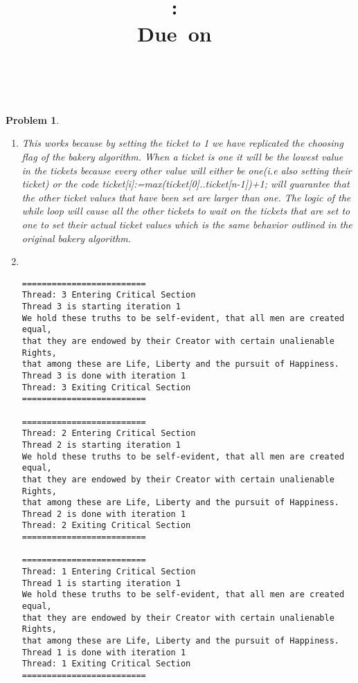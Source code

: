 \documentclass{article}
\title{
\vspace{2in}
\textmd{\textbf{\hmwkClass:\ \hmwkTitle}}\\
\normalsize\vspace{0.1in}\small{Due\ on\ \hmwkDueDate}\\
\vspace{0.1in}\large{\textit{\hmwkClassInstructor\ \hmwkClassTime}}
\vspace{3in}
}
\author{\textbf{\hmwkAuthorName}}
\date{} %
\theoremstyle{problemstyle}
\newtheorem{problem}{Problem}
\begin{document}
\maketitle



\newpage

\begin{problem} ~
\begin{enumerate}[label=(\alph*)]
	\item This works because by setting the ticket to 1 we have replicated the choosing flag of the bakery algorithm. When 
		a ticket is one it will be the lowest value in the tickets because every other value will either be one(i.e also setting their ticket) or the code ticket[i]:=max(ticket[0]..ticket[n-1])+1; will guarantee that the other ticket values that have been set are larger than one. The logic of the while loop will cause all the other tickets to wait on the tickets that are set to one to set their actual ticket values which is the same behavior outlined in the original bakery algorithm.
	\item ~
	\begin{lstlisting}
=========================
Thread: 3 Entering Critical Section
Thread 3 is starting iteration 1
We hold these truths to be self-evident, that all men are created equal,
that they are endowed by their Creator with certain unalienable Rights,
that among these are Life, Liberty and the pursuit of Happiness.
Thread 3 is done with iteration 1
Thread: 3 Exiting Critical Section
=========================

=========================
Thread: 2 Entering Critical Section
Thread 2 is starting iteration 1
We hold these truths to be self-evident, that all men are created equal,
that they are endowed by their Creator with certain unalienable Rights,
that among these are Life, Liberty and the pursuit of Happiness.
Thread 2 is done with iteration 1
Thread: 2 Exiting Critical Section
=========================

=========================
Thread: 1 Entering Critical Section
Thread 1 is starting iteration 1
We hold these truths to be self-evident, that all men are created equal,
that they are endowed by their Creator with certain unalienable Rights,
that among these are Life, Liberty and the pursuit of Happiness.
Thread 1 is done with iteration 1
Thread: 1 Exiting Critical Section
=========================


\end{lstlisting}
\end{enumerate}
\end{problem}
\end{document}
